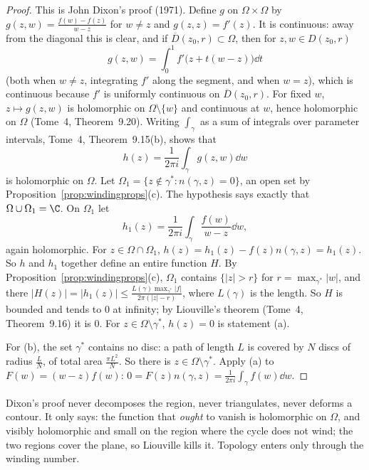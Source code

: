 \begin{proof}
This is John Dixon's proof (1971). Define $g$ on $\Omega\times\Omega$ by $g(z,w)=\frac{f(w)-f(z)}{w-z}$ for $w\ne z$ and $g(z,z)=f'(z)$. It is continuous: away from the diagonal this is clear, and if
$\overline D(z_0,r)\subset\Omega$, then for $z,w\in D(z_0,r)$
\[
g(z,w)=\int_0^1f'\bigl(z+t(w-z)\bigr)\dd t
\]
(both when $w\ne z$, integrating $f'$ along the segment, and when $w=z$), which is continuous because $f'$ is uniformly continuous on $\overline D(z_0,r)$. For fixed $w$, $z\mapsto g(z,w)$ is holomorphic on
$\Omega\setminus\{w\}$ and continuous at $w$, hence holomorphic on $\Omega$ (Tome~4, Theorem~9.20). Writing $\int_\gamma$ as a sum of integrals over parameter intervals, Tome~4, Theorem~9.15(b), shows that
\[
h(z)=\frac1{2\pi i}\int_\gamma g(z,w)\dd w
\]
is holomorphic on $\Omega$. Let $\Omega_1=\{z\notin\gamma^*:n(\gamma,z)=0\}$, an open set by Proposition~\ref{prop:windingprops}(c). The hypothesis says exactly that $\Omega\cup\Omega_1=\C$. On $\Omega_1$ let
\[
h_1(z)=\frac1{2\pi i}\int_\gamma\frac{f(w)}{w-z}\dd w,
\]
again holomorphic. For $z\in\Omega\cap\Omega_1$, $h(z)=h_1(z)-f(z)n(\gamma,z)=h_1(z)$. So $h$ and $h_1$ together define an entire function $H$. By Proposition~\ref{prop:windingprops}(c), $\Omega_1$
contains $\{|z|>r\}$ for $r=\max_{\gamma^*}|w|$, and there $|H(z)|=|h_1(z)|\le\frac{L(\gamma)\max_{\gamma^*}|f|}{2\pi(|z|-r)}$, where $L(\gamma)$ is the length. So $H$ is bounded and tends to $0$ at infinity; by
Liouville's theorem (Tome~4, Theorem~9.16) it is $0$. For $z\in\Omega\setminus\gamma^*$, $h(z)=0$ is statement (a).

For (b), the set $\gamma^*$ contains no disc: a path of length $L$ is covered by $N$ discs of radius $\frac LN$, of total area $\frac{\pi L^2}N$. So there is $z\in\Omega\setminus\gamma^*$. Apply (a) to
$F(w)=(w-z)f(w)$: $0=F(z)n(\gamma,z)=\frac1{2\pi i}\int_\gamma f(w)\dd w$.
\end{proof}

\begin{beauty}
Dixon's proof never decomposes the region, never triangulates, never deforms a contour. It only says: the function that \emph{ought} to vanish is holomorphic on $\Omega$, and visibly holomorphic and
small on the region where the cycle does not wind; the two regions cover the plane, so Liouville kills it. Topology enters only through the winding number.
\end{beauty}

